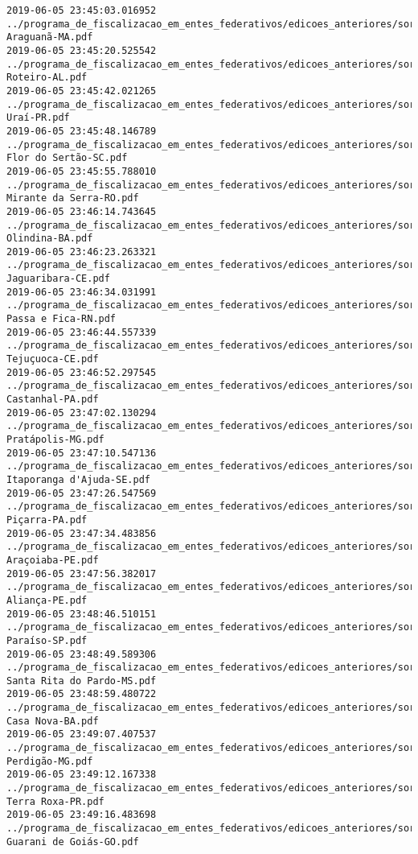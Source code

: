 \begin{lstlisting}
2019-06-05 23:45:03.016952 ../programa_de_fiscalizacao_em_entes_federativos/edicoes_anteriores/sorteio_37/2805-Araguanã-MA.pdf
2019-06-05 23:45:20.525542 ../programa_de_fiscalizacao_em_entes_federativos/edicoes_anteriores/sorteio_37/2773-Roteiro-AL.pdf
2019-06-05 23:45:42.021265 ../programa_de_fiscalizacao_em_entes_federativos/edicoes_anteriores/sorteio_37/2765-Uraí-PR.pdf
2019-06-05 23:45:48.146789 ../programa_de_fiscalizacao_em_entes_federativos/edicoes_anteriores/sorteio_37/2775-Flor do Sertão-SC.pdf
2019-06-05 23:45:55.788010 ../programa_de_fiscalizacao_em_entes_federativos/edicoes_anteriores/sorteio_37/2819-Mirante da Serra-RO.pdf
2019-06-05 23:46:14.743645 ../programa_de_fiscalizacao_em_entes_federativos/edicoes_anteriores/sorteio_37/2835-Olindina-BA.pdf
2019-06-05 23:46:23.263321 ../programa_de_fiscalizacao_em_entes_federativos/edicoes_anteriores/sorteio_37/2779-Jaguaribara-CE.pdf
2019-06-05 23:46:34.031991 ../programa_de_fiscalizacao_em_entes_federativos/edicoes_anteriores/sorteio_37/2799-Passa e Fica-RN.pdf
2019-06-05 23:46:44.557339 ../programa_de_fiscalizacao_em_entes_federativos/edicoes_anteriores/sorteio_37/2809-Tejuçuoca-CE.pdf
2019-06-05 23:46:52.297545 ../programa_de_fiscalizacao_em_entes_federativos/edicoes_anteriores/sorteio_37/2839-Castanhal-PA.pdf
2019-06-05 23:47:02.130294 ../programa_de_fiscalizacao_em_entes_federativos/edicoes_anteriores/sorteio_37/2869-Pratápolis-MG.pdf
2019-06-05 23:47:10.547136 ../programa_de_fiscalizacao_em_entes_federativos/edicoes_anteriores/sorteio_37/2797-Itaporanga d'Ajuda-SE.pdf
2019-06-05 23:47:26.547569 ../programa_de_fiscalizacao_em_entes_federativos/edicoes_anteriores/sorteio_37/3072-Piçarra-PA.pdf
2019-06-05 23:47:34.483856 ../programa_de_fiscalizacao_em_entes_federativos/edicoes_anteriores/sorteio_37/2815-Araçoiaba-PE.pdf
2019-06-05 23:47:56.382017 ../programa_de_fiscalizacao_em_entes_federativos/edicoes_anteriores/sorteio_37/2827-Aliança-PE.pdf
2019-06-05 23:48:46.510151 ../programa_de_fiscalizacao_em_entes_federativos/edicoes_anteriores/sorteio_37/2861-Paraíso-SP.pdf
2019-06-05 23:48:49.589306 ../programa_de_fiscalizacao_em_entes_federativos/edicoes_anteriores/sorteio_37/2801-Santa Rita do Pardo-MS.pdf
2019-06-05 23:48:59.480722 ../programa_de_fiscalizacao_em_entes_federativos/edicoes_anteriores/sorteio_38/2957-Casa Nova-BA.pdf
2019-06-05 23:49:07.407537 ../programa_de_fiscalizacao_em_entes_federativos/edicoes_anteriores/sorteio_38/2993-Perdigão-MG.pdf
2019-06-05 23:49:12.167338 ../programa_de_fiscalizacao_em_entes_federativos/edicoes_anteriores/sorteio_38/3032-Terra Roxa-PR.pdf
2019-06-05 23:49:16.483698 ../programa_de_fiscalizacao_em_entes_federativos/edicoes_anteriores/sorteio_38/2977-Guarani de Goiás-GO.pdf

\end{lstlisting}
